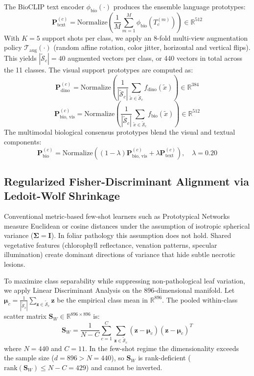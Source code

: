 \documentclass[conference]{IEEEtran}
\begin{document}
The BioCLIP text encoder $\phi_{\text{bio}}(\cdot)$ produces the ensemble language prototypes:
\begin{equation}
\mathbf{P}_{\text{text}}^{(c)} = \text{Normalize}\left(\frac{1}{M}\sum_{m=1}^M \phi_{\text{bio}}(T_c^{(m)})\right) \in \mathbb{R}^{512}
\end{equation}
With $K=5$ support shots per class, we apply an 8-fold multi-view augmentation policy $\mathcal{T}_{\text{aug}}(\cdot)$ (random affine rotation, color jitter, horizontal and vertical flips). This yields $|\tilde{\mathcal{S}}_c| = 40$ augmented vectors per class, or 440 vectors in total across the 11 classes. The visual support prototypes are computed as:
\begin{equation}
\mathbf{P}_{\text{dino}}^{(c)} = \text{Normalize}\left(\frac{1}{|\tilde{\mathcal{S}}_c|}\sum_{\tilde{x} \in \tilde{\mathcal{S}}_c} f_{\text{dino}}(\tilde{x})\right) \in \mathbb{R}^{384}
\end{equation}
\begin{equation}
\mathbf{P}_{\text{bio, vis}}^{(c)} = \text{Normalize}\left(\frac{1}{|\tilde{\mathcal{S}}_c|}\sum_{\tilde{x} \in \tilde{\mathcal{S}}_c} f_{\text{bio}}(\tilde{x})\right) \in \mathbb{R}^{512}
\end{equation}
The multimodal biological consensus prototypes blend the visual and textual components:
\begin{equation}
\mathbf{P}_{\text{bio}}^{(c)} = \text{Normalize}\left((1-\lambda)\mathbf{P}_{\text{bio, vis}}^{(c)} + \lambda \mathbf{P}_{\text{text}}^{(c)}\right), \quad \lambda = 0.20
\end{equation}

\subsection{Regularized Fisher-Discriminant Alignment via Ledoit-Wolf Shrinkage}
Conventional metric-based few-shot learners such as Prototypical Networks \cite{snell2017prototypical} measure Euclidean or cosine distances under the assumption of isotropic spherical variance ($\mathbf{\Sigma} = \mathbf{I}$). In foliar pathology this assumption does not hold. Shared vegetative features (chlorophyll reflectance, venation patterns, specular illumination) create dominant directions of variance that hide subtle necrotic lesions.

To maximize class separability while suppressing non-pathological leaf variation, we apply Linear Discriminant Analysis on the 896-dimensional manifold. Let $\boldsymbol{\mu}_c = \frac{1}{|\tilde{\mathcal{S}}_c|}\sum_{\mathbf{z} \in \tilde{\mathcal{S}}_c} \mathbf{z}$ be the empirical class mean in $\mathbb{R}^{896}$. The pooled within-class scatter matrix $\mathbf{S}_W \in \mathbb{R}^{896 \times 896}$ is:
\begin{equation}
\mathbf{S}_W = \frac{1}{N - C}\sum_{c=1}^C \sum_{\mathbf{z} \in \tilde{\mathcal{S}}_c} (\mathbf{z} - \boldsymbol{\mu}_c)(\mathbf{z} - \boldsymbol{\mu}_c)^T
\end{equation}
where $N = 440$ and $C = 11$. In the few-shot regime the dimensionality exceeds the sample size ($d = 896 > N = 440$), so $\mathbf{S}_W$ is rank-deficient ($\text{rank}(\mathbf{S}_W) \le N - C = 429$) and cannot be inverted.
\end{document}
